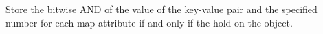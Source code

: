 Store the bitwise AND of the value of the key-value pair and the specified
number for each map attribute if and only if the  hold on the
object.



